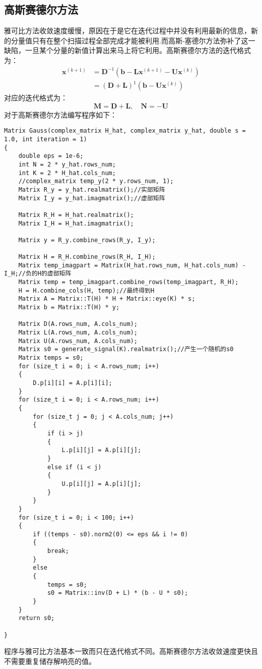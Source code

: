 \documentclass[twocolumn]{ctexart}
\begin{document}
\subsection{高斯赛德尔方法}
\par 雅可比方法收敛速度缓慢，原因在于是它在迭代过程中并没有利用最新的信息，新的分量值只有在整个扫描过程全部完成才能被利用.而高斯-塞德尔方法弥补了这一缺陷，一旦某个分量的新值计算出来马上将它利用。高斯赛德尔方法的迭代格式为：
\[\begin{aligned}
\boldsymbol{x}^{(k+1)} &=\boldsymbol{D}^{-1}\left(\boldsymbol{b}-\boldsymbol{L} \boldsymbol{x}^{(k+1)}-\boldsymbol{U} \boldsymbol{x}^{(k)}\right) \\
&=(\boldsymbol{D}+\boldsymbol{L})^{1}\left(\boldsymbol{b}-\boldsymbol{U} \boldsymbol{x}^{(k)}\right)
\end{aligned}\]
对应的迭代格式为：
\[\boldsymbol{M}=\boldsymbol{D}+\boldsymbol{L}, \quad \boldsymbol{N}=-\boldsymbol{U}\]
对于高斯赛德尔方法编写程序如下：
\begin{lstlisting}
Matrix Gauss(complex_matrix H_hat, complex_matrix y_hat, double s = 1.0, int iteration = 1)
{
	double eps = 1e-6;
	int N = 2 * y_hat.rows_num;
	int K = 2 * H_hat.cols_num;
	//complex_matrix temp_y(2 * y.rows_num, 1);
	Matrix R_y = y_hat.realmatrix();//实部矩阵
	Matrix I_y = y_hat.imagmatrix();//虚部矩阵

	Matrix R_H = H_hat.realmatrix();
	Matrix I_H = H_hat.imagmatrix();

	Matrix y = R_y.combine_rows(R_y, I_y);

	Matrix H = R_H.combine_rows(R_H, I_H);
	Matrix temp_imagpart = Matrix(H_hat.rows_num, H_hat.cols_num) - I_H;//负的H的虚部矩阵
	Matrix temp = temp_imagpart.combine_rows(temp_imagpart, R_H);
	H = H.combine_cols(H, temp);//最终得到H
	Matrix A = Matrix::T(H) * H + Matrix::eye(K) * s;
	Matrix b = Matrix::T(H) * y;

	Matrix D(A.rows_num, A.cols_num);
	Matrix L(A.rows_num, A.cols_num);
	Matrix U(A.rows_num, A.cols_num);
	Matrix s0 = generate_signal(K).realmatrix();//产生一个随机的s0
	Matrix temps = s0;
	for (size_t i = 0; i < A.rows_num; i++)
	{
		D.p[i][i] = A.p[i][i];
	}
	for (size_t i = 0; i < A.rows_num; i++)
	{
		for (size_t j = 0; j < A.cols_num; j++)
		{
			if (i > j)
			{
				L.p[i][j] = A.p[i][j];
			}
			else if (i < j)
			{
				U.p[i][j] = A.p[i][j];
			}
		}
	}
	for (size_t i = 0; i < 100; i++)
	{
		if ((temps - s0).norm2(0) <= eps && i != 0)
		{
			break;
		}
		else
		{
			temps = s0;
			s0 = Matrix::inv(D + L) * (b - U * s0);
		}
	}
	return s0;

}

\end{lstlisting}
程序与雅可比方法基本一致而只在迭代格式不同。高斯赛德尔方法收敛速度更快且不需要重复储存解响亮的值。
\end{document}
